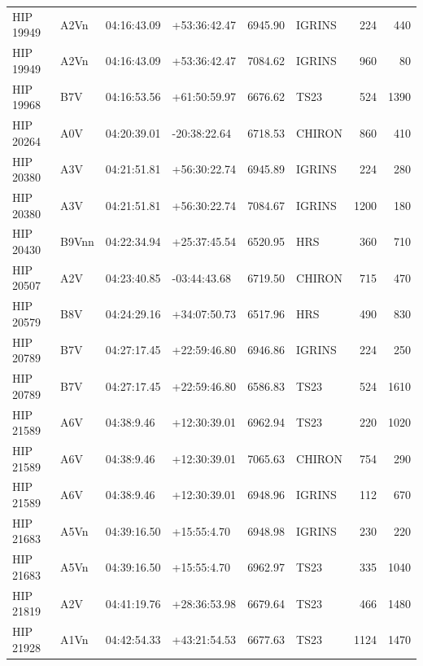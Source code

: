 \documentclass{emulateapj}
\begin{document}
\begin{longtable*}{|l|lllrlrr|}
   HIP 19949 &           A2Vn &    04:16:43.09 &   +53:36:42.47 &  6945.90 &     IGRINS &      224 &     440 \\
   HIP 19949 &           A2Vn &    04:16:43.09 &   +53:36:42.47 &  7084.62 &     IGRINS &      960 &      80 \\
   HIP 19968 &            B7V &    04:16:53.56 &   +61:50:59.97 &  6676.62 &       TS23 &      524 &    1390 \\
   HIP 20264 &            A0V &    04:20:39.01 &   -20:38:22.64 &  6718.53 &     CHIRON &      860 &     410 \\
   HIP 20380 &            A3V &    04:21:51.81 &   +56:30:22.74 &  6945.89 &     IGRINS &      224 &     280 \\
   HIP 20380 &            A3V &    04:21:51.81 &   +56:30:22.74 &  7084.67 &     IGRINS &     1200 &     180 \\
   HIP 20430 &          B9Vnn &    04:22:34.94 &   +25:37:45.54 &  6520.95 &        HRS &      360 &     710 \\
   HIP 20507 &            A2V &    04:23:40.85 &   -03:44:43.68 &  6719.50 &     CHIRON &      715 &     470 \\
   HIP 20579 &            B8V &    04:24:29.16 &   +34:07:50.73 &  6517.96 &        HRS &      490 &     830 \\
   HIP 20789 &            B7V &    04:27:17.45 &   +22:59:46.80 &  6946.86 &     IGRINS &      224 &     250 \\
   HIP 20789 &            B7V &    04:27:17.45 &   +22:59:46.80 &  6586.83 &       TS23 &      524 &    1610 \\
   HIP 21589 &            A6V &     04:38:9.46 &   +12:30:39.01 &  6962.94 &       TS23 &      220 &    1020 \\
   HIP 21589 &            A6V &     04:38:9.46 &   +12:30:39.01 &  7065.63 &     CHIRON &      754 &     290 \\
   HIP 21589 &            A6V &     04:38:9.46 &   +12:30:39.01 &  6948.96 &     IGRINS &      112 &     670 \\
   HIP 21683 &           A5Vn &    04:39:16.50 &    +15:55:4.70 &  6948.98 &     IGRINS &      230 &     220 \\
   HIP 21683 &           A5Vn &    04:39:16.50 &    +15:55:4.70 &  6962.97 &       TS23 &      335 &    1040 \\
   HIP 21819 &            A2V &    04:41:19.76 &   +28:36:53.98 &  6679.64 &       TS23 &      466 &    1480 \\
   HIP 21928 &           A1Vn &    04:42:54.33 &   +43:21:54.53 &  6677.63 &       TS23 &     1124 &    1470 \\

\end{longtable*}
\end{document}
